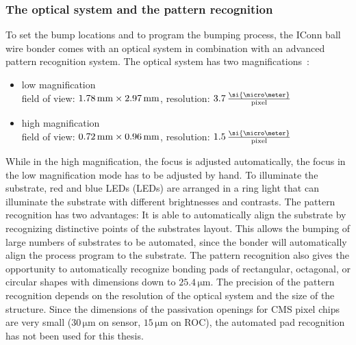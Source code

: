 \subsubsection{The optical system and the pattern recognition}
To set the bump locations and to program the bumping process, the IConn ball wire bonder comes with an optical system in combination with an advanced pattern recognition system. The optical system has two magnifications~\cite{Hei12}:
\begin{itemize}
\item low magnification\\
field of view: $1.78\,\rm{mm}\times 2.97\,\rm{mm}$, resolution: $3.7\,\frac{\si{\micro \meter}}{\rm{pixel}}$
\item high magnification\\
field of view: $0.72\,\rm{mm}\times 0.96\,\rm{mm}$, resolution: $1.5\,\frac{\si{\micro \meter}}{\rm{pixel}}$
\end{itemize}
While in the high magnification, the focus is adjusted automatically, the focus in the low magnification mode has to be adjusted by hand. To illuminate the substrate, red and blue \acl{LED}s (\acs{LED}s) are arranged in a ring light that can illuminate the substrate with different brightnesses and contrasts. %
The pattern recognition has two advantages: It is able to automatically align the substrate by recognizing distinctive points of the substrates layout. This allows the bumping of large numbers of substrates to be automated, since the bonder will automatically align the process program to the substrate. The pattern recognition also gives the opportunity to automatically recognize bonding pads of rectangular, octagonal, or circular shapes with dimensions down to $25.4\,\si{\micro \meter}$. The precision of the pattern recognition depends on the resolution of the optical system and the size of the structure. Since the dimensions of the passivation openings for \ac{CMS} pixel chips are very small ($30\,\si{\micro \meter}$ on sensor, $15\,\si{\micro \meter}$ on \acs{ROC}), the automated pad recognition has not been used for this thesis.


